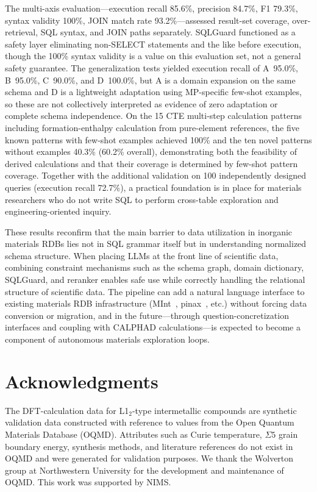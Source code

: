 The multi-axis evaluation---execution recall 85.6\%, precision 84.7\%, F1 79.3\%, syntax validity 100\%, JOIN match rate 93.2\%---assessed result-set coverage, over-retrieval, SQL syntax, and JOIN paths separately. SQLGuard functioned as a safety layer eliminating non-SELECT statements and the like before execution, though the 100\% syntax validity is a value on this evaluation set, not a general safety guarantee. The generalization tests yielded execution recall of A~95.0\%, B~95.0\%, C~90.0\%, and D~100.0\%, but A is a domain expansion on the same schema and D is a lightweight adaptation using MP-specific few-shot examples, so these are not collectively interpreted as evidence of zero adaptation or complete schema independence. On the 15 CTE multi-step calculation patterns including formation-enthalpy calculation from pure-element references, the five known patterns with few-shot examples achieved 100\% and the ten novel patterns without examples 40.3\% (60.2\% overall), demonstrating both the feasibility of derived calculations and that their coverage is determined by few-shot pattern coverage. Together with the additional validation on 100 independently designed queries (execution recall 72.7\%), a practical foundation is in place for materials researchers who do not write SQL to perform cross-table exploration and engineering-oriented inquiry.

These results reconfirm that the main barrier to data utilization in inorganic materials RDBs lies not in SQL grammar itself but in understanding normalized schema structure. When placing LLMs at the front line of scientific data, combining constraint mechanisms such as the schema graph, domain dictionary, SQLGuard, and reranker enables safe use while correctly handling the relational structure of scientific data. The pipeline can add a natural language interface to existing materials RDB infrastructure (MInt~\cite{minamoto2020mint}, pinax~\cite{minamoto2026pinax}, etc.) without forcing data conversion or migration, and in the future---through question-concretization interfaces and coupling with CALPHAD calculations---is expected to become a component of autonomous materials exploration loops.

\section*{Acknowledgments}

The DFT-calculation data for L1$_2$-type intermetallic compounds are synthetic validation data constructed with reference to values from the Open Quantum Materials Database (OQMD). Attributes such as Curie temperature, $\Sigma 5$ grain boundary energy, synthesis methods, and literature references do not exist in OQMD and were generated for validation purposes. We thank the Wolverton group at Northwestern University for the development and maintenance of OQMD. This work was supported by NIMS.

